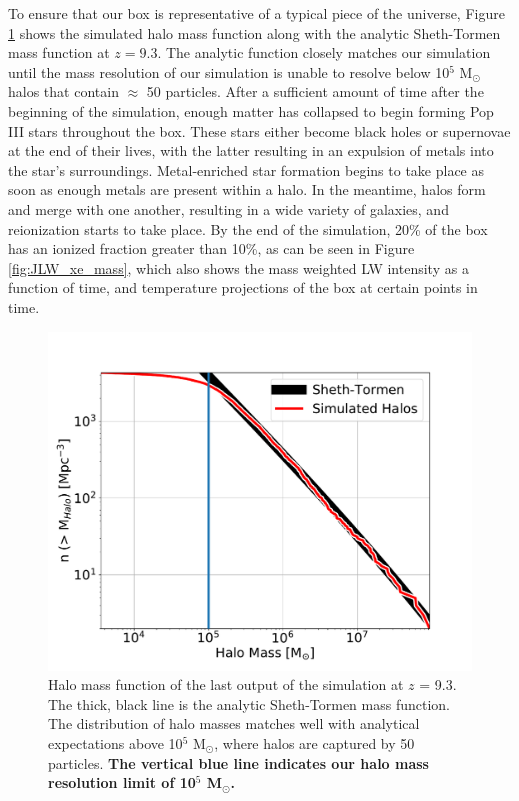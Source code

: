 \documentclass[fleqn,usenatbib]{mnras}
\begin{document}
To ensure that our box is representative of a typical piece of the universe, Figure \ref{fig:hmf} shows the simulated halo mass function along with the analytic Sheth-Tormen mass function at $z = 9.3$. The analytic function closely matches our simulation until the mass resolution of our simulation is unable to resolve below 10$^{5}$ M$_{\odot}$ halos that contain $\approx$ 50 particles. After a sufficient amount of time after the beginning of the simulation, enough matter has collapsed to begin forming Pop III stars throughout the box. These stars either become black holes or supernovae at the end of their lives, with the latter resulting in an expulsion of metals into the star's surroundings. Metal-enriched star formation begins to take place as soon as enough metals are present within a halo. In the meantime, halos form and merge with one another, resulting in a wide variety of galaxies, and reionization starts to take place. By the end of the simulation, 20\% of the box has an ionized fraction greater than 10\%, as can be seen in Figure \ref{fig:JLW_xe_mass}, which also shows the mass weighted LW intensity as a function of time, and temperature projections of the box at certain points in time. 

\begin{figure}
	\includegraphics[width=\columnwidth]{images/hmf.pdf}
    \caption{Halo mass function of the last output of the simulation at $z$ = 9.3. The thick, black line is the analytic Sheth-Tormen mass function. The distribution of halo masses matches well with analytical expectations above 10$^{5}$ M$_{\odot}$, where halos are captured by 50 particles. \textbf{The vertical blue line indicates our halo mass resolution limit of 10$^{5}$ M$_{\odot}$.}}
    \label{fig:hmf}
\end{figure}
\end{document}
